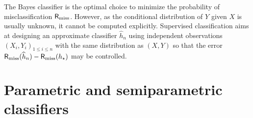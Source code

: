 The Bayes classifier is the optimal choice to minimize the probability of misclassification $\mathsf{R}_{\mathrm{miss}}$. However, as the conditional distribution of $Y$ given $X$ is usually unknown, it cannot be computed explicitly. Supervised classification aims at designing an approximate classifier $\widehat h_n$ using independent observations $(X_i,Y_i)_{1\leqslant i\leqslant n}$ with the same distribution as $(X,Y)$ so that the error $\mathsf{R}_{\mathrm{miss}}(\widehat h_n)-\mathsf{R}_{\mathrm{miss}}(h_{\star})$ may be controlled.

\section{Parametric and semiparametric classifiers}
